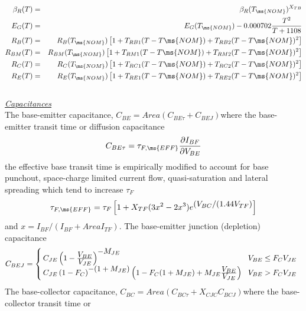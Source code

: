 \begin{eqnarray}
\beta_R(T)&=&\beta_R(T_{\ms{NOM}})^{X_{TB}}\\
E_G(T) & = & E_G(T_{\ms{NOM}}) - 0.000702{{T^2} \over {T+1108}}\\
R_B(T) & = & R_B(T_{\ms{NOM}})\left[ 1 + T_{RB1} (T -
T{\ms{NOM}})
         + T_{RB2} (T -  T{\ms{NOM}})^2\right]\\
R_{BM}(T) & = & R_{BM}(T_{\ms{NOM}})\left[ 1 + T_{RM1} (T -
T{\ms{NOM}})
         + T_{RM2} (T -  T{\ms{NOM}})^2\right]\\
R_C(T) & = & R_C(T_{\ms{NOM}})\left[ 1 + T_{RC1} (T -
T{\ms{NOM}})
         + T_{RC2} (T -  T{\ms{NOM}})^2\right]\\
R_E(T) & = & R_E(T_{\ms{NOM}})\left[ 1 + T_{RE1} (T -
T{\ms{NOM}})
         + T_{RE2} (T -  T{\ms{NOM}})^2\right]
\end{eqnarray}\\[0.1in]
\noindent\underline{\sl \large Capacitances}\\[0.1in]
  \noindent The base-emitter capacitance, $C_{BE} =
Area( C_{BE\tau} + C_{BEJ})$\inlineeq where the base-emitter
transit time or diffusion capacitance
\begin{equation}
C_{BE\tau} = \tau_{F,\ms{EFF}} {{\textstyle\partial I_{BF}} \over
       {\textstyle\partial V_{BE}}}
\end{equation}
the effective base transit time is empirically modified to account
for base punchout, space-charge limited current flow,
quasi-saturation and lateral spreading which tend to increase
$\tau_F$
\begin{equation}
\tau_{F,\ms{EFF}} =\tau_F\left[ 1+X_{TF}(3x^2-2x^3)
     e^{\textstyle (V_{BC}/(1.44V_{TF})}\right]
\end{equation}
and $x = {I_{BF}}/(I_{BF} + Area I_{TF})$. The base-emitter
junction (depletion) capacitance
\begin{equation}
C_{BEJ} = \left\{ \!\! \begin{array}{ll}
   C_{JE} \left(1-{{\textstyle V_{BE}}\over
   {\textstyle V_{JE}}}\right)^{\textstyle -M_{JE}}
   & \! V_{BE} \le F_C V_{JE}\\
   C_{JE} \left(1-F_C\right)^{\textstyle -(1+M_{JE})}
          \left(1-F_C(1+M_{JE})+M_{JE}{{\textstyle V_{BE}}\over
          {\textstyle V_{JE}}} \right)
   & \! V_{BE} > F_C V_{JE}
   \end{array} \right. %
\end{equation}
The base-collector capacitance, $C_{BC} = Area(C_{BC\tau} +X_{CJC}
C_{BCJ})$\inlineeq where the base-collector transit time or
